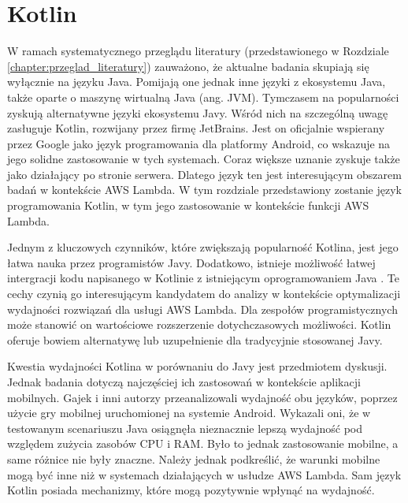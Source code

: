 \section{Kotlin}\label{chapter:kotlin_multiplatform}

W ramach systematycznego przeglądu literatury (przedstawionego w Rozdziale \ref{chapter:przeglad_literatury}) zauważono, że aktualne badania skupiają się wyłącznie na języku Java.
Pomijają one jednak inne języki z ekosystemu Java, także oparte o maszynę wirtualną Java (ang. JVM).
Tymczasem na popularności zyskują alternatywne języki ekosystemu Javy.
Wśród nich na szczególną uwagę zasługuje Kotlin, rozwijany przez firmę JetBrains.
Jest on oficjalnie wspierany przez Google jako język programowania dla platformy Android, co wskazuje na jego solidne zastosowanie w tych systemach.
Coraz większe uznanie zyskuje także jako działający po stronie serwera. 
Dlatego język ten jest interesującym obszarem badań w kontekście AWS Lambda.
W tym rozdziale przedstawiony zostanie język programowania Kotlin, w tym jego zastosowanie w kontekście funkcji AWS Lambda.

Jednym z kluczowych czynników, które zwiększają popularność Kotlina, jest jego łatwa nauka przez programistów Javy.
Dodatkowo, istnieje możliwość łatwej intergracji kodu napisanego w Kotlinie z istniejącym oprogramowaniem Java \cite{kotlinlangKotlinDocs}.
Te cechy czynią go interesującym kandydatem do analizy w kontekście optymalizacji wydajności rozwiązań dla usługi AWS Lambda. 
Dla zespołów programistycznych może stanowić on wartościowe rozszerzenie dotychczasowych możliwości. 
Kotlin oferuje bowiem alternatywę lub uzupełnienie dla tradycyjnie stosowanej Javy.

Kwestia wydajności Kotlina w porównaniu do Javy jest przedmiotem dyskusji. 
Jednak badania dotyczą najczęściej ich zastosowań w kontekście aplikacji mobilnych.
Gajek i inni autorzy \cite{Gajek_Plechawska-Wójcik_2024} przeanalizowali wydajność obu języków, poprzez użycie gry mobilnej uruchomionej na systemie Android.
Wykazali oni, że w testowanym scenariuszu Java osiągnęła nieznacznie lepszą wydajność pod względem zużycia zasobów CPU i RAM.
Było to jednak zastosowanie mobilne, a same różnice nie były znaczne.
Należy jednak podkreślić, że warunki mobilne mogą być inne niż w systemach działających w usłudze AWS Lambda.
Sam język Kotlin posiada mechanizmy, które mogą pozytywnie wpłynąć na wydajność.

